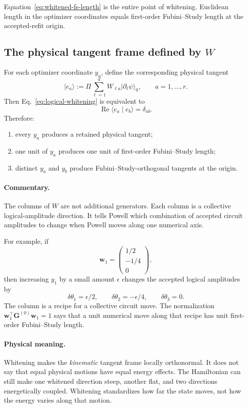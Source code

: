 \documentclass[11pt]{article}
\newcommand{\ket}[1]{\lvert #1\rangle}
\newcommand{\braket}[2]{\langle #1\mid #2\rangle}
\newcommand{\commentary}{\paragraph{Commentary.}}
\newcommand{\physical}{\paragraph{Physical meaning.}}
\begin{document}
Equation~\eqref{eq:whitened-fs-length} is the entire point of whitening.
Euclidean length in the optimizer coordinates equals first-order
Fubini--Study length at the accepted-refit origin.

\subsection*{The physical tangent frame defined by \(W\)}

For each optimizer coordinate \(y_a\), define the corresponding physical
tangent
\begin{equation}
\ket{e_a}
:=
\Pi
\sum_{\ell=1}^{d}
W_{\ell a}\ket{\partial_\ell\psi}_{0},
\qquad
a=1,\ldots,r.
\label{eq:whitened-tangents}
\end{equation}
Then Eq.~\eqref{eq:logical-whitening} is equivalent to
\begin{equation}
\operatorname{Re}\braket{e_a}{e_b}
=
\delta_{ab}.
\label{eq:orthonormal-tangents}
\end{equation}
Therefore:
\begin{enumerate}[leftmargin=1.6em,itemsep=2pt,topsep=3pt]
\item every \(y_a\) produces a retained physical tangent;
\item one unit of \(y_a\) produces one unit of first-order Fubini--Study
length;
\item distinct \(y_a\) and \(y_b\) produce Fubini--Study-orthogonal tangents
at the origin.
\end{enumerate}

\commentary The columns of \(W\) are not additional generators.  Each column
is a collective logical-amplitude direction.  It tells Powell which
combination of accepted circuit amplitudes to change when Powell moves along
one numerical axis.

For example, if
\[
\mathbf w_1
=
\begin{pmatrix}
1/2\\-1/4\\0
\end{pmatrix},
\]
then increasing \(y_1\) by a small amount \(\epsilon\) changes the accepted
logical amplitudes by
\[
\delta\theta_1=\epsilon/2,\qquad
\delta\theta_2=-\epsilon/4,\qquad
\delta\theta_3=0.
\]
The column is a recipe for a collective circuit move.  The normalization
\(\mathbf w_1^\top\mathbf G^{(0)}\mathbf w_1=1\) says that a unit numerical
move along that recipe has unit first-order Fubini--Study length.

\physical Whitening makes the \emph{kinematic} tangent frame locally
orthonormal.  It does not say that equal physical motions have equal energy
effects.  The Hamiltonian can still make one whitened direction steep, another
flat, and two directions energetically coupled.  Whitening standardizes how
far the state moves, not how the energy varies along that motion.
\end{document}
